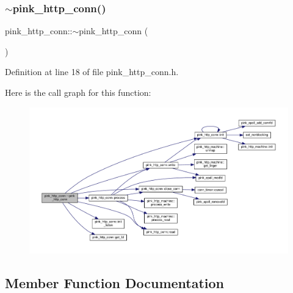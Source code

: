 \mbox{\label{classpink__http__conn_a83eb4a1a4b8afdc6bfa0959da37f0e91}} 
\subsubsection{\texorpdfstring{$\sim$pink\+\_\+http\+\_\+conn()}{~pink\_http\_conn()}}
{\footnotesize\ttfamily pink\+\_\+http\+\_\+conn\+::$\sim$pink\+\_\+http\+\_\+conn (\begin{DoxyParamCaption}{ }\end{DoxyParamCaption})\hspace{0.3cm}{\ttfamily [inline]}}



Definition at line 18 of file pink\+\_\+http\+\_\+conn.\+h.

Here is the call graph for this function\+:
\nopagebreak
\begin{figure}[H]
\begin{center}
\leavevmode
\includegraphics[width=350pt]{classpink__http__conn_a83eb4a1a4b8afdc6bfa0959da37f0e91_cgraph}
\end{center}
\end{figure}


\subsection{Member Function Documentation}
\mbox{\label{classpink__http__conn_abdcd7c0da8072d62cb7212523f20298b}} 
